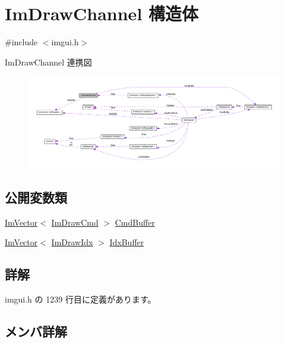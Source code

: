 \hypertarget{struct_im_draw_channel}{}\section{Im\+Draw\+Channel 構造体}
\label{struct_im_draw_channel}


{\ttfamily \#include $<$imgui.\+h$>$}



Im\+Draw\+Channel 連携図\nopagebreak
\begin{figure}[H]
\begin{center}
\leavevmode
\includegraphics[width=350pt]{struct_im_draw_channel__coll__graph}
\end{center}
\end{figure}
\subsection*{公開変数類}
\begin{DoxyCompactItemize}
\item 
\mbox{\hyperlink{class_im_vector}{Im\+Vector}}$<$ \mbox{\hyperlink{struct_im_draw_cmd}{Im\+Draw\+Cmd}} $>$ \mbox{\hyperlink{struct_im_draw_channel_abdaa17053d55fb6757c1971d410ceddf}{Cmd\+Buffer}}
\item 
\mbox{\hyperlink{class_im_vector}{Im\+Vector}}$<$ \mbox{\hyperlink{imgui_8h_afdc8744a5ac1a968b1ddfa47e13b2fa1}{Im\+Draw\+Idx}} $>$ \mbox{\hyperlink{struct_im_draw_channel_a7fbed7d3523124fadd94859d5ac0fd67}{Idx\+Buffer}}
\end{DoxyCompactItemize}


\subsection{詳解}


 imgui.\+h の 1239 行目に定義があります。



\subsection{メンバ詳解}
\mbox{\label{struct_im_draw_channel_abdaa17053d55fb6757c1971d410ceddf}} 
